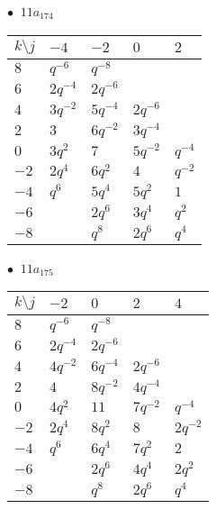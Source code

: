 \begin{minipage}{\linewidth}
$\bullet\ $ $11a_{174}$ \vspace{0.5em} \\
\begin{tabular}{l|llll}
$k \setminus j$ & $-4$ & $-2$ & $0$ & $2$ \\
\hline
$8$ & $q^{-6}$ & $q^{-8}$ &  &  \\
$6$ & $2q^{-4}$ & $2q^{-6}$ &  &  \\
$4$ & $3q^{-2}$ & $5q^{-4}$ & $2q^{-6}$ &  \\
$2$ & $3$ & $6q^{-2}$ & $3q^{-4}$ &  \\
$0$ & $3q^{2}$ & $7$ & $5q^{-2}$ & $q^{-4}$ \\
$-2$ & $2q^{4}$ & $6q^{2}$ & $4$ & $q^{-2}$ \\
$-4$ & $q^{6}$ & $5q^{4}$ & $5q^{2}$ & $1$ \\
$-6$ &  & $2q^{6}$ & $3q^{4}$ & $q^{2}$ \\
$-8$ &  & $q^{8}$ & $2q^{6}$ & $q^{4}$ \\
\end{tabular}
\vspace{2em}
\end{minipage}
%
\begin{minipage}{\linewidth}
$\bullet\ $ $11a_{175}$ \vspace{0.5em} \\
\begin{tabular}{l|llll}
$k \setminus j$ & $-2$ & $0$ & $2$ & $4$ \\
\hline
$8$ & $q^{-6}$ & $q^{-8}$ &  &  \\
$6$ & $2q^{-4}$ & $2q^{-6}$ &  &  \\
$4$ & $4q^{-2}$ & $6q^{-4}$ & $2q^{-6}$ &  \\
$2$ & $4$ & $8q^{-2}$ & $4q^{-4}$ &  \\
$0$ & $4q^{2}$ & $11$ & $7q^{-2}$ & $q^{-4}$ \\
$-2$ & $2q^{4}$ & $8q^{2}$ & $8$ & $2q^{-2}$ \\
$-4$ & $q^{6}$ & $6q^{4}$ & $7q^{2}$ & $2$ \\
$-6$ &  & $2q^{6}$ & $4q^{4}$ & $2q^{2}$ \\
$-8$ &  & $q^{8}$ & $2q^{6}$ & $q^{4}$ \\
\end{tabular}
\vspace{2em}
\end{minipage}
%
